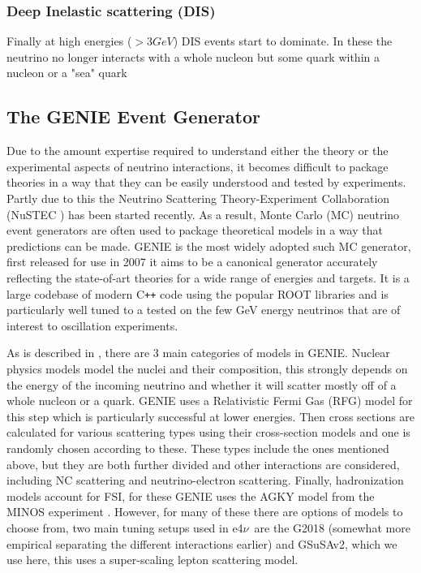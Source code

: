 \documentclass[a4paper,12pt]{article}
\newcommand{\efn}{e4$\nu$}
\begin{document}
\subsubsection{Deep Inelastic scattering (DIS)}
Finally at high energies ($>3\si{GeV}$) DIS events start to dominate.
In these the neutrino no longer interacts with a whole nucleon but some quark within a nucleon or a "sea" quark

\subsection{The GENIE Event Generator \cite{andreopoulosGENIENeutrinoMonte2010}}\label{sec:genie}
Due to the amount expertise required to understand either the theory or the experimental aspects of neutrino interactions, it becomes difficult to package theories in a way that they can be easily understood and tested by experiments.
Partly due to this the Neutrino Scattering Theory-Experiment Collaboration (NuSTEC \cite{alvarez-rusoNuSTEC11NeutrinoScattering2018}) has been started recently.
As a result, Monte Carlo (MC) neutrino event generators are often used to package theoretical models in a way that predictions can be made.
GENIE is the most widely adopted such MC generator, first released for use in 2007 it aims to be a canonical generator accurately reflecting the state-of-art theories for a wide range of energies and targets.
It is a large codebase of modern C\texttt{++} code using the popular ROOT libraries\cite{brunROOTObjectOriented1997} and is particularly well tuned to a tested on the few \si{GeV} energy neutrinos that are of interest to oscillation experiments.

As is described in \cite{andreopoulosGENIENeutrinoMonte2010}, there are 3 main categories of models in GENIE.
Nuclear physics models model the nuclei and their composition, this strongly depends on the energy of the incoming neutrino and whether it will scatter mostly off of a whole nucleon or a quark.
GENIE uses a Relativistic Fermi Gas (RFG) model for this step which is particularly successful at lower energies.
Then cross sections are calculated for various scattering types using their cross-section models and one is randomly chosen according to these.
These types include the ones mentioned above, but they are both further divided and other interactions are considered, including NC scattering and neutrino-electron scattering.
Finally, hadronization models account for FSI, for these GENIE uses the AGKY model from the MINOS experiment \cite{HadronizationModelMINOS}.
However, for many of these there are options of models to choose from, two main tuning setups used in \efn\ are the G2018 (somewhat more empirical separating the different interactions earlier) and GSuSAv2, which we use here, this uses a super-scaling lepton scattering model\cite{amaroNeutrinonucleusScatteringSuSA2021}.
\end{document}
